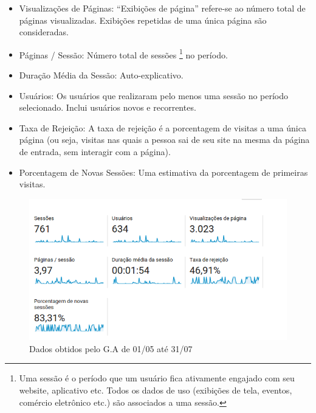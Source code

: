 \begin{itemize}
\item Visualizações de Páginas: ``Exibições de página'' refere-se ao número total de páginas visualizadas. Exibições repetidas de uma única página são consideradas.
\item Páginas / Sessão: Número total de sessões \footnote{Uma sessão é o período que um usuário fica ativamente engajado com seu website, aplicativo etc. Todos os dados de uso (exibições de tela, eventos, comércio eletrônico etc.) são associados a uma sessão.} no período.
\item Duração Média da Sessão: Auto-explicativo.
\item Usuários: Os usuários que realizaram pelo menos uma sessão no período selecionado. Inclui usuários novos e recorrentes.
\item Taxa de Rejeição: A taxa de rejeição é a porcentagem de visitas a uma única página (ou seja, visitas nas quais a pessoa sai de seu site na mesma da página de entrada, sem interagir com a página).
\item Porcentagem de Novas Sessões: Uma estimativa da porcentagem de primeiras visitas.

\end{itemize}

\begin{figure}[htb]
\includegraphics[width=15cm]{figuras/analytics_1interacao_dados}
\caption{\label{fig:analytics_1interacao_dados} Dados obtidos pelo G.A de 01/05 até 31/07}
\end{figure}

